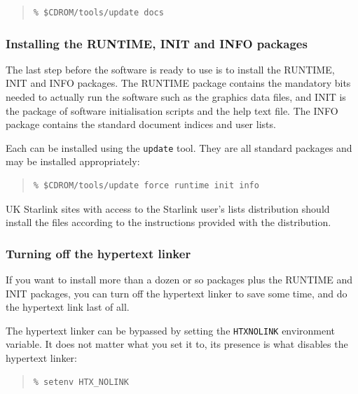 \documentclass[twoside,11pt]{article}
\renewcommand{\_}{\texttt{\symbol{95}}}
\begin{document}
\begin{quote}
\begin{verbatim}
% $CDROM/tools/update docs
\end{verbatim}
\end{quote}

\subsubsection{Installing the RUNTIME, INIT and INFO packages}

The last step before the software is ready to use is to install the
RUNTIME, INIT and INFO packages.  The RUNTIME package contains the
mandatory bits needed to actually run the software such as the graphics
data files, and INIT is the package of software initialisation scripts
and the help text file.  The INFO package contains the standard
document indices and user lists.

Each can be installed using the \texttt{update} tool.  They are all 
standard packages and may be installed appropriately:

\begin{quote}
\begin{verbatim}
% $CDROM/tools/update force runtime init info
\end{verbatim}
\end{quote}

UK Starlink sites with access to the Starlink user's lists distribution
should install the files according to the instructions provided with
the distribution.

\subsubsection{Turning off the hypertext linker}

If you want to install more than a dozen or so packages plus the
RUNTIME and INIT packages, you can turn off the hypertext linker to
save some time, and do the hypertext link last of all.

The hypertext linker can be bypassed by setting the
\texttt{HTX\_NOLINK} environment variable.  It does not matter what you
set it to, its presence is what disables the hypertext linker:

\begin{quote}
\begin{verbatim}
% setenv HTX_NOLINK
\end{verbatim}
\end{quote}
\end{document}
